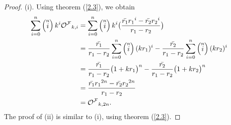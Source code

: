 \begin{proof}(i).
Using theorem (\ref{2.3}), we obtain
\begin{align*}
\sum\limits_{i=0}^{n}\left( \stackrel{n}{i}\right) k^{i}{{\mathcal{O^F}}}_{k,i}&=\sum\limits_{i=0}^{n}\left( \stackrel{n}{i}\right) k^{i}\big(\dfrac{\bar{r_1}{{r_1}}^{i}-\bar{r_2}{r_{2}}^{i}}{r_1-r_2}\big)\\
&=\dfrac{\bar{r_1}}{r_1-r_2}\sum\limits_{i=0}^{n}\left( \stackrel{n}{i}\right) (kr_1)^{i}-\dfrac{\bar{r_2}}{r_1-r_2}\sum\limits_{i=0}^{n}\left( \stackrel{n}{i}\right) (kr_2)^{i}\\
&=\dfrac{\bar{r_1}}{r_1-r_2}\big(1+kr_1\big)^n-\dfrac{\bar{r_2}}{r_1-r_2}\big(1+kr_2\big)^n\\
&=\dfrac{\bar{r_1}{{r_1}}^{2n}-\bar{r_2}{r_{2}}^{2n}}{r_1-r_2}\\
&={{\mathcal{O^F}}}_{k,2n}.
\end{align*}
The proof of (ii) is similar to (i), using theorem (\ref{2.3}).
\end{proof}
